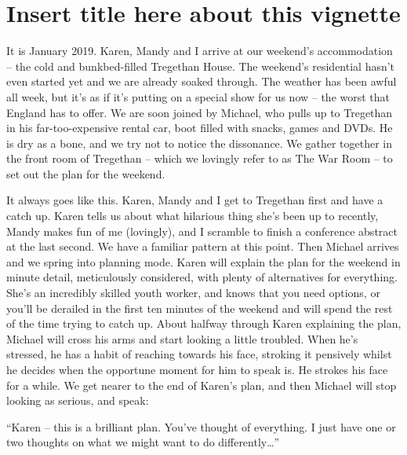 
\section{Insert title here about this vignette}
It is January 2019. Karen, Mandy and I arrive at our weekend’s accommodation – the cold and bunkbed-filled Tregethan House. The weekend's residential hasn’t even started yet and we are already soaked through. The weather has been awful all week, but it’s as if it’s putting on a special show for us now – the worst that England has to offer. We are soon joined by Michael, who pulls up to Tregethan in his far-too-expensive rental car, boot filled with snacks, games and DVDs. He is dry as a bone, and we try not to notice the dissonance. We gather together in the front room of Tregethan – which we lovingly refer to as The War Room – to set out the plan for the weekend.

It always goes like this. Karen, Mandy and I get to Tregethan first and have a catch up. Karen tells us about what hilarious thing she’s been up to recently, Mandy makes fun of me (lovingly), and I scramble to finish a conference abstract at the last second. We have a familiar pattern at this point. Then Michael arrives and we spring into planning mode. Karen will explain the plan for the weekend in minute detail, meticulously considered, with plenty of alternatives for everything. She's an incredibly skilled youth worker, and knows that you need options, or you'll be derailed in the first ten minutes of the weekend and will spend the rest of the time trying to catch up. About halfway through Karen explaining the plan, Michael will cross his arms and start looking a little troubled. When he’s stressed, he has a habit of reaching towards his face, stroking it pensively whilst he decides when the opportune moment for him to speak is. He strokes his face for a while. We get nearer to the end of Karen’s plan, and then Michael will stop looking as serious, and speak:

“Karen – this is a brilliant plan. You’ve thought of everything. I just have one or two thoughts on what we might want to do differently…”

